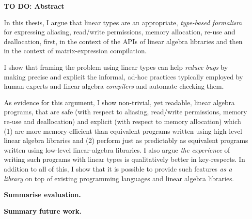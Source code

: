 \newpage
{\normalfont\Huge\sffamily\bfseries TO DO: Abstract}
\vspace{24pt}

In this thesis, I argue that linear types are an appropriate, \emph{type-based
formalism} for expressing aliasing, read/write permissions, memory allocation,
re-use and deallocation, first, in the context of the APIs of linear algebra
libraries and then in the context of matrix-expression compilation.

I show that framing the problem using linear types can help \emph{reduce bugs}
by making precise and explicit the informal, ad-hoc practices typically
employed by human experts and linear algebra \emph{compilers} and automate
checking them.

As evidence for this argument, I show non-trivial, yet readable, linear algebra
programs, that are safe (with respect to aliasing, read/write permissions,
memory re-use and deallocation) and explicit (with respect to memory
allocation) which (1) are more memory-efficient than equivalent programs
written using high-level linear algebra libraries and (2) perform just
as predictably as equivalent programs written using low-level linear-algebra
libraries. I also argue \emph{the experience} of writing such programs with
linear types is qualitatively better in key-respects. In addition to all of
this, I show that it is possible to provide such features \emph{as a library}
on top of existing programming languages and linear algebra libraries.

\textbf{Summarise evaluation.}

\textbf{Summary future work.}

\newpage
\vspace*{\fill}
